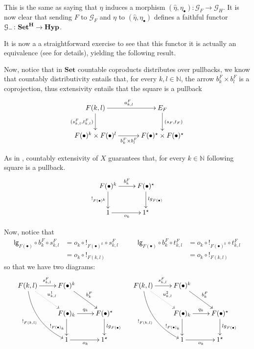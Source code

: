 \documentclass[runningheads,envcountsect]{lipics-v2021}
\newcommand{\lgh}{\mathsf{lg}}
\newcommand{\Set}{\mathbf{Set}}
\newcommand{\catname}[1]{\textbf{\textup{#1}}}
\newcommand{\hyp}{\catname{Hyp}}
\begin{document}
This is the same as saying that $\eta$ induces a morphism $(\hat{\eta}, \eta_{\bullet})\colon \mathcal{G}_F\to \mathcal{G}_H$. It is now clear that sending $F$ to $\mathcal{G}_F$ and $\eta$ to $(\hat{\eta}, \eta_{\bullet})$ defines a faithful functor $\mathcal{G}_{-}\colon \Set^{\catname{H}}\to \hyp$.

It is now a a straightforward exercise to see that this functor it is actually an equivalence (see \cite{castelnovo2023thesis} for details), yielding the following result.

	\iffalse 
\begin{remark}\label{rem:utile}
Now, notice that in $\Set$ countable coproducts distributes over pullbacks,  we know that countably distributivity entails that, for every $k,l\in \mathbb{N}$, the arrow $b^F_k\times b^F_l$ is a coprojection, thus extensivity entails that the square is a pullback 
	\[\xymatrix@C=30pt{F(k,l) \ar[d]_{(s^F_{k,l}, t^F_{k,l})}  \ar[r]^{a^F_{k,l}}& E_F \ar[d]^{(s_F, t_F)} \\ F(\bullet)^k\times F(\bullet)^l \ar[r]_{b^F_k\times b^F_l} & F(\bullet)^\star\times F(\bullet)^\star}\]
	
	

	As in , countably extensivity of $X$ guarantees that, for every $k\in \mathbb{N}$ following square is a pullback.	
	\[\xymatrix{F(\bullet)^k  \ar[r]^{b^F_k} \ar[d]_{!_{F(\bullet)^k}}& F(\bullet)^\star \ar[d]^{\lgh_{F(\bullet)}} \\ 1 \ar[r]_{o_k} & 1^\star}\]
	
	
	
	
	
	Now, notice that 
	\[\begin{split}
		\lgh_{F(\bullet)}\circ b^{F}_k\circ s^{F}_{k,l}&=o_{k}\circ !_{F(\bullet)^k}\circ s^F_{k,l}\\&=o_k\circ !_{F(k,l)}
	\end{split} \qquad \begin{split}
	\lgh_{F(\bullet)}\circ b^{F}_k\circ t^{F}_{k,l}&=o_{k}\circ !_{F(\bullet)^k}\circ t^F_{k,l}\\&=o_k\circ !_{F(k,l)}
	\end{split}\]
so that we have two diagrams:
	\[\xymatrix{F(k,l)\ar[r]^{s^F_{k,l}} \ar@{.>}[dr]^{u^1_{k,l}}  \ar@/_.5cm/[ddr]_{!_{F(k,l)}}&F(\bullet)^k \ar[dr]^{b^F_k}&& F(k,l) \ar@/_.5cm/[ddr]_{!_{F(k,l)}} \ar[r]^{s^F_{k,l}} \ar@{.>}[dr]^{u^2_{k,l}} &F(\bullet)^k \ar[dr]^{b^F_k}\\ & F(\bullet)_k  \ar[r]^{q_{k}} \ar[d]_{!_{F(\bullet)_k}}& F(\bullet)^\star \ar[d]^{\lgh_{F(\bullet)}} && F(\bullet)_k  \ar[r]^{q_{k} }\ar[d]_{!_{F(\bullet)_k}}& F(\bullet)^\star \ar[d]^{\lgh_{F(\bullet)}} \\ &  1 \ar[r]_{o_k} & 1^\star && 1 \ar[r]_{o_k} & 1^\star}\]
	

\end{remark}
\end{document}
